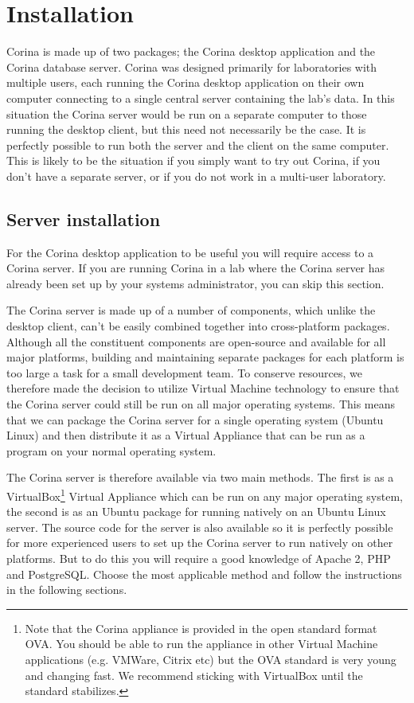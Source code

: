 
\chapter{Installation}
\label{txt:installation}
Corina is made up of two packages; the Corina desktop application and the Corina database server.  Corina was designed primarily for laboratories with multiple users, each running the Corina desktop application on their own computer connecting to a single central server containing the lab's data.  In this situation the Corina server would be run on a separate computer to those running the desktop client, but this need not necessarily be the case.  It is perfectly possible to run both the server and the client on the same computer.  This is likely to be the situation if you simply want to try out Corina, if you don't have a separate server, or if you do not work in a multi-user laboratory.


\section{Server installation}
For the Corina desktop application to be useful you will require access to a Corina server.  If you are running Corina in a lab where the Corina server has already been set up by your systems administrator, you can skip this section.

The Corina server is made up of a number of components, which unlike the desktop client, can't be easily combined together into cross-platform packages.  Although all the constituent components are open-source and available for all major platforms, building and maintaining separate packages for each platform is too large a task for a small development team.  To conserve resources, we therefore made the decision to utilize Virtual Machine technology to ensure that the Corina server could still be run on all major operating systems.  This means that we can package the Corina server for a single operating system (Ubuntu Linux) and then distribute it as a Virtual Appliance that can be run as a program on your normal operating system. 

The Corina server is therefore available via two main methods.  The first is as a VirtualBox\footnote{Note that the Corina appliance is provided in the open standard format OVA.  You should be able to run the appliance in other Virtual Machine applications (e.g. VMWare, Citrix etc) but the OVA standard is very young and changing fast.  We recommend sticking with VirtualBox until the standard stabilizes. } Virtual Appliance which can be run on any major operating system, the second is as an Ubuntu package for running natively on an Ubuntu Linux server.  The source code for the server is also available so it is perfectly possible for more experienced users to set up the Corina server to run natively on other platforms.  But to do this you will require a good knowledge of Apache 2, PHP and PostgreSQL.  Choose the most applicable method and follow the instructions in the following sections.

